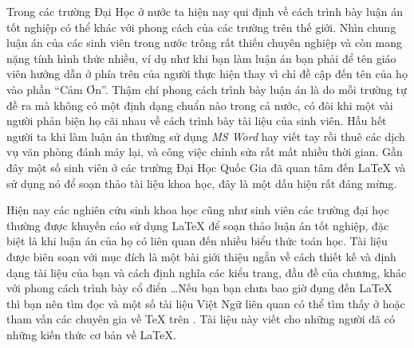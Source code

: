 \documentclass[a4paper]{report}
\begin{document}
\begin{htmlonly}
%
%
%
%
%
%
%
\end{htmlonly}

Trong các trường Đại Học ở nước ta hiện nay qui định về cách trình bày luận án tốt nghiệp có thể khác với phong cách của các trường trên thế giới. Nhìn chung luận án của các sinh viên trong nước trông rất thiếu chuyên nghiệp và còn mang nặng tính hình thức nhiều, ví dụ như khi bạn làm luận án bạn phải để tên giáo viên hướng dẫn ở phía trên của người thực hiện thay vì chỉ đề cập đến tên của họ vào phần ``Cảm Ơn''. Thậm chí phong cách trình bày luận án là do mỗi trường tự đề ra mà không có một định dạng chuẩn nào trong cả nước, có đôi khi một vài người phản biện họ cãi nhau về cách trình bày tài liệu của sinh viên. Hầu hết người ta khi làm luận án thường  sử dụng \emph{MS Word} hay viết tay rồi thuê các dịch vụ văn phòng đánh máy lại, và công việc chỉnh sửa rất mất nhiều thời gian. Gần đây một số sinh viên ở các trường Đại Học Quốc Gia đã quan tâm đến \LaTeX{} và sử dụng nó để soạn thảo tài liệu khoa học, đây là một dấu hiệu rất đáng mừng.

Hiện nay các nghiên cứu sinh khoa học cũng như sinh viên các trường đại học thường được khuyến cáo sử dụng \LaTeX{} để soạn thảo luận án tốt nghiệp, đặc biệt là khi luận án của họ có liên quan đến nhiều biểu thức toán học. Tài liệu được biên soạn với mục đích là một bài giới thiệu ngắn về cách thiết kế và định dạng tài liệu của bạn và cách  định nghĩa các kiểu trang, đầu đề của chương, khác với phong cách trình bày cổ điển \ldots Nếu bạn bạn chưa bao giờ đụng đến \LaTeX{} thì bạn nên tìm đọc  và một số tài liệu Việt Ngữ liên quan có thể tìm thấy ở  hoặc tham vấn các chuyên gia về \TeX{} trên . Tài liệu này viết cho những người đã có những kiến thức cơ bản về \LaTeX{}.\\
\end{document}
